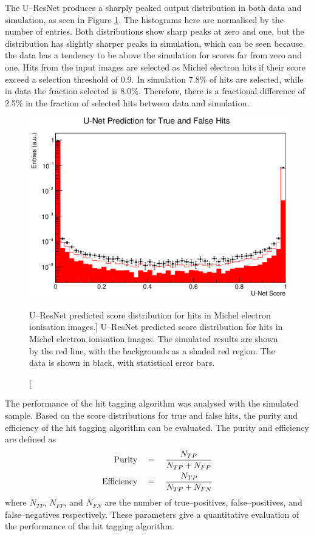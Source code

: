 The U--ResNet produces a sharply peaked output distribution in both data and
simulation, as seen in Figure \ref{fig:unet_pred_data}. The histograms here are
normalised by the number of entries. Both distributions show sharp peaks at zero
and one, but the distribution has slightly sharper peaks in simulation, which
can be seen because the data has a tendency to be above the simulation for
scores far from zero and one. Hits from the input images are selected as
Michel electron hits if their score exceed a selection threshold of 0.9. In
simulation 7.8\% of hits are selected, while in data the fraction selected is
8.0\%. Therefore, there is a fractional difference of 2.5\% in the fraction of
selected hits between data and simulation.
\begin{figure}
	\centering
	\includegraphics[width=\textwidth]{figures/unet_pred_data.pdf}
	\caption
	[U--ResNet predicted score distribution for hits in Michel electron ionisation
	images.]
	{U--ResNet predicted score distribution for hits in Michel electron
	ionisation images. The simulated results are shown by the red line, with the
	backgrounds as a shaded red region. The data is shown in black, with
	statistical error bars.}
	\label{fig:unet_pred_data}
\end{figure}

The performance of the hit tagging algorithm was analysed with the simulated
sample. Based on the score distributions for true and false hits, the purity
and efficiency of the hit tagging algorithm can be evaluated. The purity and 
efficiency are defined as
\begin{align*}
	\mbox{Purity} \quad &= \quad  \frac{N_{TP}}{N_{TP} + N_{FP}} \\
	\vspace{2mm}
	\mbox{Efficiency} \quad &= \quad \frac{N_{TP}}{N_{TP} + N_{FN}}
\end{align*}
where $N_{TP}$, $N_{FP}$, and $N_{FN}$ are the number of true--positives,
false--positives, and false--negatives respectively. These parameters give a
quantitative evaluation of the performance of the hit tagging algorithm.

